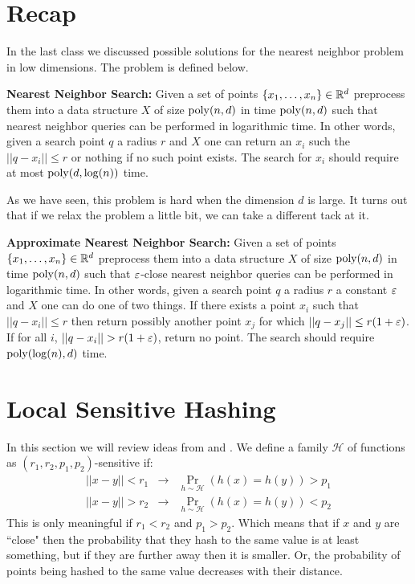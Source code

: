 \documentclass{article}
\begin{document}

\section{Recap}
In the last class we discussed possible solutions for the nearest neighbor problem in low dimensions.
The problem is defined below.
\begin{definition}{\bf Nearest Neighbor Search:} Given a set of points $\{x_1,\ldots,x_n\} \in {\mathbb{R}}^{d}$ 
preprocess them into a data structure
$X$ of size ${\operatorname{poly}}(n,d)$ in time ${\operatorname{poly}}(n,d)$ such that nearest neighbor queries can
be performed in logarithmic time. In other words, given a search point $q$ a radius $r$ and $X$ one can 
return an $x_i$ such the $||q - x_i || \le r$ or nothing if no such point exists.  The search for $x_i$ should
require at most ${\operatorname{poly}}(d,\log(n))$ time.
\end{definition}

As we have seen, this problem is hard when the dimension $d$ is large.
It turns out that if we relax the problem a little bit, we can take a different tack at it.
\begin{definition}
{\bf Approximate Nearest Neighbor Search:} Given a set of points $\{x_1,\ldots,x_n\} \in {\mathbb{R}}^{d}$ 
preprocess them into a data structure
$X$ of size ${\operatorname{poly}}(n ,d)$ in time ${\operatorname{poly}}(n ,d)$ such that $\varepsilon$-close nearest neighbor queries can
be performed in logarithmic time. In other words, given a search point $q$ a radius $r$ a constant $\varepsilon$ and $X$ one can 
do one of two things. If there exists a point $x_i$ such that $||q - x_i || \le r$ then return possibly another point $x_j$ for which 
$||q - x_j || \le r(1+\varepsilon)$. If for all $i$, $||q - x_i || > r(1+\varepsilon)$, return no point.
The search should require ${\operatorname{poly}}(\log(n),d)$ time.
\end{definition}

\section{Local Sensitive Hashing}
In this section we will review ideas from \cite{Charikar02} and \cite{GionisIM99}.
We define a family $\mathcal{H}$
of functions as $(r_1,r_2,p_1,p_2)$-sensitive if:
\begin{eqnarray*} 
|| x- y || < r_1 &\rightarrow& \Pr_{h \sim \mathcal{H}}(h(x)=h(y)) > p_1\\
|| x- y || > r_2 &\rightarrow& \Pr_{h \sim \mathcal{H}}(h(x)=h(y)) < p_2
\end{eqnarray*}
This is only meaningful if $r_1 < r_2$ and $p_1 > p_2$.
Which means that if $x$ and $y$ are ``close" then the probability that
they hash to the same value is at least something, but if they are further away
then it is smaller. Or, the probability of points being hashed to the same value 
decreases with their distance.
\end{document}
